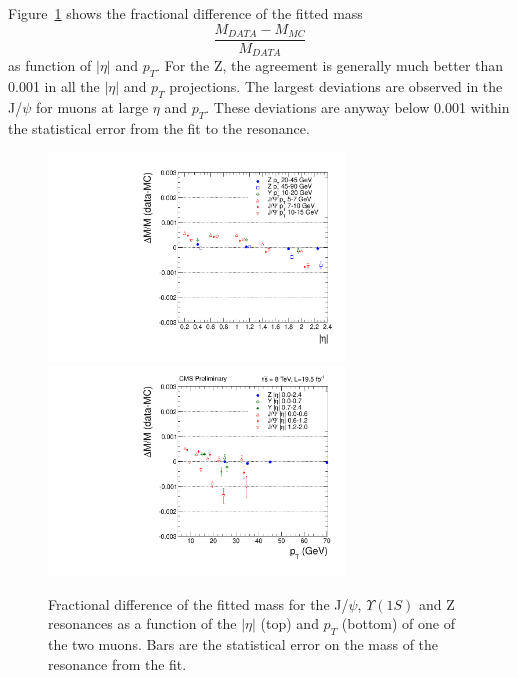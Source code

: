 Figure~\ref{fig:ScaleDATAMC_8TeV} shows the fractional difference of the fitted mass
\[
\frac{M_{DATA}-M_{MC}}{M_{DATA}}
\]
as function of $|\eta|$ and  $p_T$. For the Z, the agreement is
generally much better than 0.001 in all the $|\eta|$ and $p_T$ projections.
The largest deviations are observed in the J/$\psi$ for muons at large
$\eta$ and $p_T$. These deviations are anyway below 0.001 within the
statistical error from the fit to the resonance.
\begin{figure}[hbtp]  
\begin{center}
\includegraphics[width=0.7\textwidth]{figures/H4l_Style/2012_22Jan2013ReReco/ScaleEta_afterCorrection}
\includegraphics[width=0.7\textwidth]{figures/H4l_Style/2012_22Jan2013ReReco/ScalePt_afterCorrection} 
 \hspace{1cm} 
   \caption{Fractional difference of the fitted mass for the J/$\psi$,
     $\Upsilon(1S)$ and Z resonances as a function of the $|\eta|$ (top)
     and $p_T$ (bottom) of one of the two muons. Bars are the
     statistical error on the mass of the resonance from the fit.
   \label{fig:ScaleDATAMC_8TeV}}
 \end{center}
\end{figure} 

